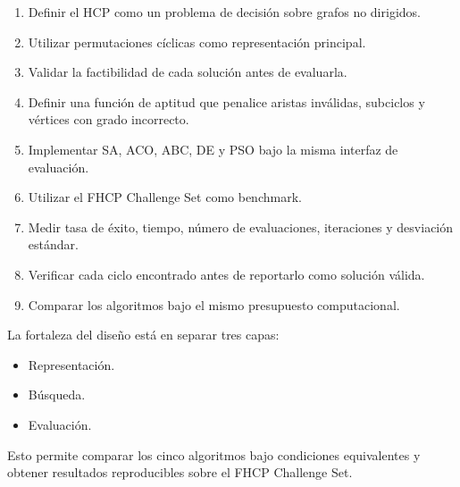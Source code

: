 \documentclass[12pt]{article}
\begin{document}
\begin{enumerate}
    \item Definir el HCP como un problema de decisión sobre grafos no dirigidos.
    \item Utilizar permutaciones cíclicas como representación principal.
    \item Validar la factibilidad de cada solución antes de evaluarla.
    \item Definir una función de aptitud que penalice aristas inválidas, subciclos y vértices con grado incorrecto.
    \item Implementar SA, ACO, ABC, DE y PSO bajo la misma interfaz de evaluación.
    \item Utilizar el FHCP Challenge Set como benchmark.
    \item Medir tasa de éxito, tiempo, número de evaluaciones, iteraciones y desviación estándar.
    \item Verificar cada ciclo encontrado antes de reportarlo como solución válida.
    \item Comparar los algoritmos bajo el mismo presupuesto computacional.
\end{enumerate}

La fortaleza del diseño está en separar tres capas:

\begin{itemize}
    \item Representación.
    \item Búsqueda.
    \item Evaluación.
\end{itemize}

Esto permite comparar los cinco algoritmos bajo condiciones equivalentes y obtener resultados reproducibles sobre el FHCP Challenge Set. \cite{haythorpe}
\end{document}

